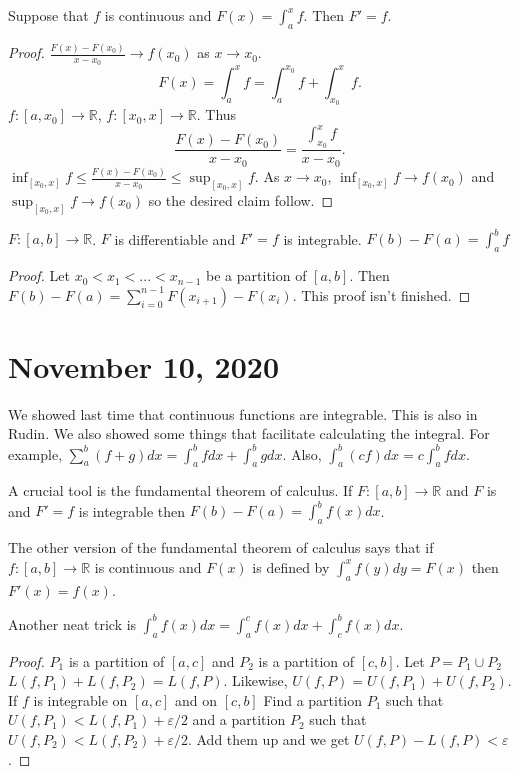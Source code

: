 \documentclass{article}
\newcommand{\R}{\mathbb{R}}
\newcommand{\eps}{\varepsilon}
\newcommand{\ra}[1][]{\xrightarrow{#1}}
\begin{document}
\begin{theorem}
Suppose that $f$ is continuous and $F(x)=\int_a^xf$. Then $F'=f$.
\end{theorem}
\begin{proof}
$\frac{F(x)-F(x_0)}{x-x_0}\ra f(x_0)$ as $x\ra x_0$. $$F(x)=\int_a^xf=\int_a^{x_0}f+\int_{x_0}^xf.$$ $f:[a,x_0]\ra \R$, $f:[x_0,x]\ra\R$. Thus $$\frac{F(x)-F(x_0)}{x-x_0}=\frac{\int_{x_0}^xf}{x-x_0}.$$ $\inf_{[x_0,x]}f\leq \frac{F(x)-F(x_0)}{x-x_0}\leq \sup_{[x_0,x]}f$. As $x\ra x_0$, $\inf_{[x_0,x]}f\ra f(x_0)$ and $\sup_{[x_0,x]}f\ra f(x_0)$ so the desired claim follow.
\end{proof}
\begin{theorem}
$F:[a,b]\ra\R$. $F$ is differentiable and $F'=f$ is integrable. $F(b)-F(a)=
\int_a^bf$
\end{theorem}
\begin{proof}
Let $x_0<x_1<...<x_{n-1}$ be a partition of $[a,b]$. Then $F(b)-F(a)=\sum_{i=0}^{n-1}F(x_{i+1})-F(x_i)$. This proof isn't finished.
\end{proof}
\section{November 10, 2020}
We showed last time that continuous functions are integrable. This is also in Rudin. We also showed some things that facilitate calculating the integral. For example, $\sum_a^b(f+g)dx=\int_a^bfdx+\int_a^bgdx$. Also, $\int_a^b(cf)dx=c\int_a^bfdx$.

A crucial tool is the fundamental theorem of calculus. If $F:[a,b]\ra \R$ and $F$ is and $F'=f$ is integrable then $F(b)-F(a)=\int_a^b f(x)dx$.

The other version of the fundamental theorem of calculus says that if $f:[a,b]\ra\R$ is continuous and $F(x)$ is defined by $\int_a^xf(y)dy=F(x)$ then $F'(x)=f(x)$.
\begin{lemma}
Another neat trick is $\int_a^bf(x)dx=\int_a^cf(x)dx+\int_c^bf(x)dx$.
\end{lemma}
\begin{proof}
$P_1$ is a partition of $[a,c]$ and $P_2$ is a partition of $[c,b]$. Let $P=P_1\cup P_2$ $L(f,P_1)+L(f,P_2)=L(f,P)$. Likewise, $U(f,P)=U(f,P_1)+U(f,P_2)$. If $f$ is integrable on $[a,c]$ and on $[c,b]$ Find a partition $P_1$ such that $U(f,P_1)<L(f,P_1)+\eps/2$ and a partition $P_2$ such that $U(f,P_2)<L(f,P_2)+\eps/2$. Add them up and we get $U(f,P)-L(f,P)<\eps$.
\end{proof}
\end{document}
